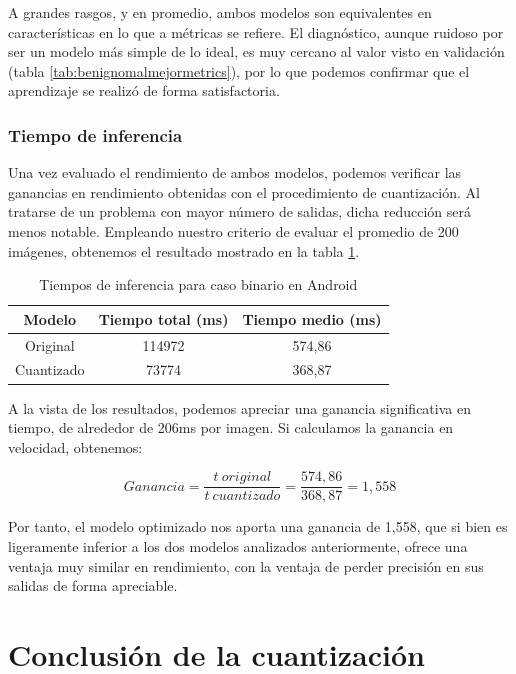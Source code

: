 A grandes rasgos, y en promedio, ambos modelos son equivalentes en características en lo que a métricas se refiere. El diagnóstico, aunque ruidoso por ser un modelo más simple de lo ideal, es muy cercano al valor visto en validación (tabla \ref{tab:benignomalmejormetrics}), por lo que podemos confirmar que el aprendizaje se realizó de forma satisfactoria.

\subsubsection{Tiempo de inferencia}
Una vez evaluado el rendimiento de ambos modelos, podemos verificar las ganancias en rendimiento obtenidas con el procedimiento de cuantización. Al tratarse de un problema con mayor número de salidas, dicha reducción será menos notable. Empleando nuestro criterio de evaluar el promedio de 200 imágenes, obtenemos el resultado mostrado en la tabla \ref{tab:infbin}.
\begin{table}[H]
	\centering
	\begin{tabular}{|c|c|c|}
		\hline
		Modelo & Tiempo total (ms) & Tiempo medio (ms) \\ \hline
		Original & 114972 & 574,86	 \\ \hline
		Cuantizado & 73774 & 368,87 \\ \hline
	\end{tabular}
	\caption{Tiempos de inferencia para caso binario en Android}
	\label{tab:infbin}
\end{table}

A la vista de los resultados, podemos apreciar una ganancia significativa en tiempo, de alrededor de 206ms por imagen. Si calculamos la ganancia en velocidad, obtenemos:

$$Ganancia = \frac{t\ original}{t\ cuantizado} = \frac{574,86}{368,87} = 1,558$$

Por tanto, el modelo optimizado nos aporta una ganancia de 1,558, que si bien es ligeramente inferior a los dos modelos analizados anteriormente, ofrece una ventaja muy similar en rendimiento, con la ventaja de perder precisión en sus salidas de forma apreciable.


\section{Conclusión de la cuantización}

